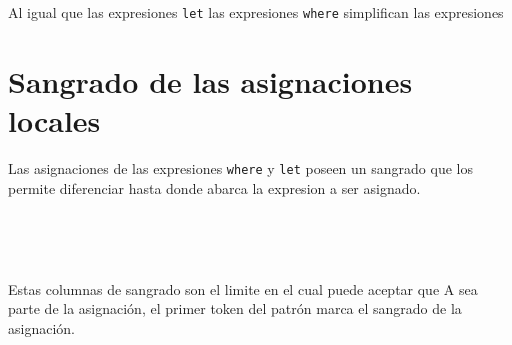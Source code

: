       \begin{fxcode}
         \\
         \\
         \\
         \\
         \\
         \\
         \\
      \end{fxcode}
      
      Al igual que las expresiones \texttt{let} las expresiones \texttt{where} simplifican las expresiones
      
   \section{Sangrado de las asignaciones locales}
      Las asignaciones de las expresiones \texttt{where} y \texttt{let} poseen un sangrado que los permite diferenciar hasta donde abarca la expresion a ser asignado.
      
      \begin{fxcode}
         \\
      \end{fxcode}
      
      \begin{fxcode}
         \\
      \end{fxcode}
      
      Estas columnas de sangrado son el limite en el cual puede aceptar que A sea parte de la asignación, el primer token del patrón marca el sangrado de la asignación.
      
      \begin{fxcode}
         \\
      \end{fxcode}
      
